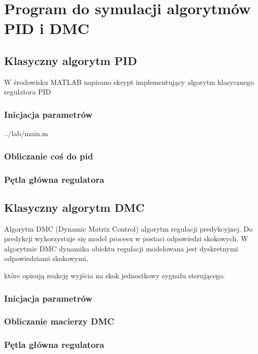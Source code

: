 \section{Program do symulacji algorytmów PID i DMC}
\label{projekt:zad3}

\subsection{Klasyczny algorytm PID}
\label{projekt:zad3:PID:program}

W środowisku MATLAB napisano skrypt implementujący algorytm klasycznego regulatora PID

\subsubsection{Inicjacja parametrów}


    {../lab/main.m}
\newpage

\subsubsection{Obliczanie coś do pid}
%
\newpage


\subsubsection{Pętla główna regulatora}
%

\newpage

\subsection{Klasyczny algorytm DMC}
\label{projekt:zad3:DMC:program}

Algorytm DMC (Dynamic Matrix Control) algorytm regulacji predykcyjnej. 
Do predykcji wykorzystuje się model procesu w postaci odpowiedzi skokowych. 
W algorytmie DMC dynamika obiektu regulacji modelowana jest dyskretnymi odpowiedziami skokowymi, 

które opisują reakcję wyjścia na skok jednostkowy sygnału sterującego.

\subsubsection{Inicjacja parametrów}
%
\newpage

\subsubsection{Obliczanie macierzy DMC}
%
\newpage


\subsubsection{Pętla główna regulatora}
%
\newpage
